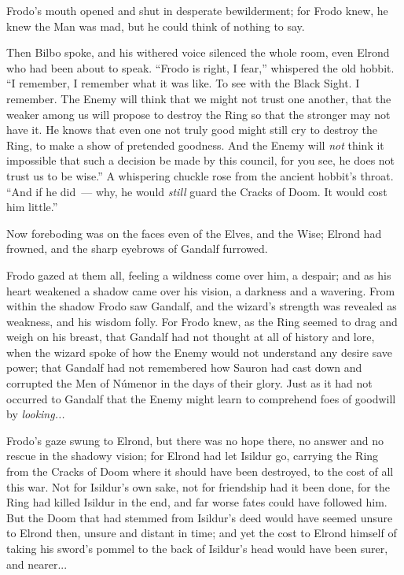 Frodo's mouth opened and shut in desperate bewilderment; for Frodo knew, he knew the Man was mad, but he could think of nothing to say.

Then Bilbo spoke, and his withered voice silenced the whole room, even Elrond who had been about to speak. ``Frodo is right, I fear,'' whispered the old hobbit. ``I remember, I remember what it was like. To see with the Black Sight. I remember. The Enemy will think that we might not trust one another, that the weaker among us will propose to destroy the Ring so that the stronger may not have it. He knows that even one not truly good might still cry to destroy the Ring, to make a show of pretended goodness. And the Enemy will \emph{not} think it impossible that such a decision be made by this council, for you see, he does not trust us to be wise.'' A whispering chuckle rose from the ancient hobbit's throat. ``And if he did~--- why, he would \emph{still} guard the Cracks of Doom. It would cost him little.''

Now foreboding was on the faces even of the Elves, and the Wise; Elrond had frowned, and the sharp eyebrows of Gandalf furrowed.

Frodo gazed at them all, feeling a wildness come over him, a despair; and as his heart weakened a shadow came over his vision, a darkness and a wavering. From within the shadow Frodo saw Gandalf, and the wizard's strength was revealed as weakness, and his wisdom folly. For Frodo knew, as the Ring seemed to drag and weigh on his breast, that Gandalf had not thought at all of history and lore, when the wizard spoke of how the Enemy would not understand any desire save power; that Gandalf had not remembered how Sauron had cast down and corrupted the Men of Númenor in the days of their glory. Just as it had not occurred to Gandalf that the Enemy might learn to comprehend foes of goodwill by \emph{looking...}

Frodo's gaze swung to Elrond, but there was no hope there, no answer and no rescue in the shadowy vision; for Elrond had let Isildur go, carrying the Ring from the Cracks of Doom where it should have been destroyed, to the cost of all this war. Not for Isildur's own sake, not for friendship had it been done, for the Ring had killed Isildur in the end, and far worse fates could have followed him. But the Doom that had stemmed from Isildur's deed would have seemed unsure to Elrond then, unsure and distant in time; and yet the cost to Elrond himself of taking his sword's pommel to the back of Isildur's head would have been surer, and nearer...

